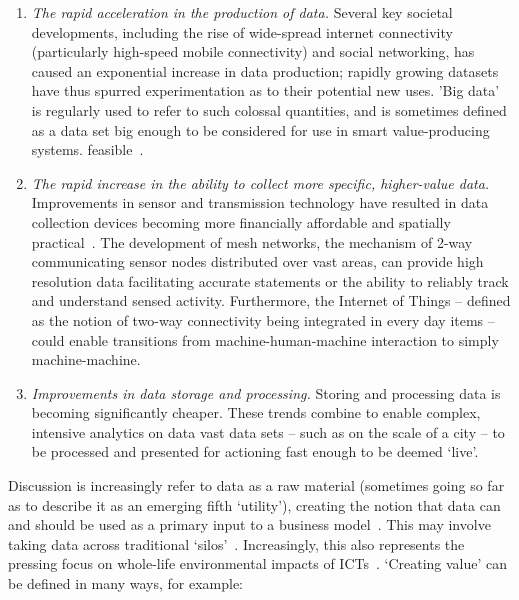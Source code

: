 \documentclass[journal]{IEEEtran}
\begin{document}
\begin{enumerate}
\item {\emph{The rapid acceleration in the production of data.}}
Several key societal developments, including the rise of wide-spread
internet connectivity (particularly high-speed mobile connectivity)
and social networking, has caused an exponential increase in data
production; rapidly growing datasets have thus spurred experimentation
as to their potential new uses. 'Big data' is regularly used to refer
to such colossal quantities, and is sometimes defined as a data set
big enough to be considered for use in smart value-producing
systems. feasible~\cite{hollands:2008,ibmsmartcities:2009,ciscoconcities:2010}.
\item {\emph{The rapid increase in the ability to collect more
specific, higher-value data.}} Improvements in sensor and transmission
technology have resulted in data collection devices becoming more
financially affordable and spatially
practical~\cite{townsend:2013}. The development of mesh networks, the
mechanism of 2-way communicating sensor nodes distributed over vast
areas, can provide high resolution data facilitating accurate
statements or the ability to reliably track and understand sensed
activity. Furthermore, the Internet of Things -- defined as the notion
of two-way connectivity being integrated in every day items -- could
enable transitions from machine-human-machine interaction to simply
machine-machine.
\item {\emph{Improvements in data storage and processing.}}  Storing
and processing data is becoming significantly cheaper. These trends
combine to enable complex, intensive analytics on data vast data sets
-- such as on the scale of a city -- to be processed and presented for
actioning fast enough to be deemed `live'.
\end{enumerate}

Discussion is increasingly refer to data as a raw material (sometimes
going so far as to describe it as an emerging fifth `utility'),
creating the notion that data can and should be used as a primary
input to a business model~\cite{arup-et-al:2011}. This may involve
taking data across traditional
`silos'~\cite{shapiro:2006,tsoukalas:2008}. Increasingly, this also
represents the pressing focus on whole-life environmental impacts of
ICTs~\cite{cooper-et-al-gsict:2015}. `Creating value' can be defined
in many ways, for example:
\end{document}
